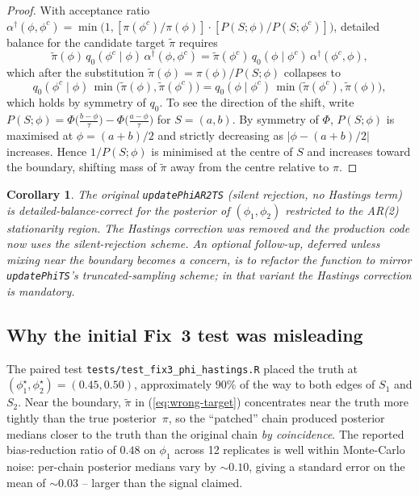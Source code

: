 \documentclass[11pt]{article}
\newcommand{\eref}[1]{(\ref{#1})}
\theoremstyle{plain}
\newtheorem{corollary}[proposition]{Corollary}
\theoremstyle{definition}
\theoremstyle{remark}
\begin{document}
\begin{proof}
With acceptance ratio $\alpha^\dagger(\phi, \phi^c) = \min\!\bigl(1,
[\pi(\phi^c)/\pi(\phi)] \cdot [P(S;\phi)/P(S;\phi^c)]\bigr)$,
detailed balance for the candidate target $\widetilde\pi$ requires
\[
\widetilde\pi(\phi)\, q_0(\phi^c \mid \phi)\, \alpha^\dagger(\phi, \phi^c)
= \widetilde\pi(\phi^c)\, q_0(\phi \mid \phi^c)\, \alpha^\dagger(\phi^c, \phi),
\]
which after the substitution $\widetilde\pi(\phi) = \pi(\phi)/P(S;\phi)$
collapses to
\[
q_0(\phi^c \mid \phi)\, \min\!\bigl(\widetilde\pi(\phi),\widetilde\pi(\phi^c)\bigr)
= q_0(\phi \mid \phi^c)\, \min\!\bigl(\widetilde\pi(\phi^c),\widetilde\pi(\phi)\bigr),
\]
which holds by symmetry of $q_0$. To see the direction of the shift,
write $P(S; \phi) = \Phi\!\bigl(\tfrac{b-\phi}{\tau}\bigr)
- \Phi\!\bigl(\tfrac{a-\phi}{\tau}\bigr)$ for $S = (a, b)$. By symmetry of
$\Phi$, $P(S; \phi)$ is maximised at $\phi = (a + b)/2$ and strictly
decreasing as $|\phi - (a+b)/2|$ increases. Hence $1/P(S;\phi)$ is
minimised at the centre of $S$ and increases toward the boundary,
shifting mass of $\widetilde\pi$ away from the centre relative to $\pi$.
\end{proof}

\begin{corollary}\label{cor:revert}
The original \texttt{updatePhiAR2TS} (silent rejection, no Hastings term)
is detailed-balance-correct for the posterior of $(\phi_1, \phi_2)$
restricted to the AR(2) stationarity region. The Hastings correction was
removed and the production code now uses the silent-rejection scheme. An
optional follow-up, deferred unless mixing near the boundary becomes a
concern, is to refactor the function to mirror \texttt{updatePhiTS}'s
truncated-sampling scheme; in that variant the Hastings correction is
mandatory.
\end{corollary}

\subsection{Why the initial Fix~3 test was misleading}\label{sec:misleading-test}

The paired test \texttt{tests/test\_fix3\_phi\_hastings.R} placed the truth
at $(\phi_1^\star, \phi_2^\star) = (0.45, 0.50)$, approximately $90\%$ of
the way to both edges of $S_1$ and $S_2$. Near the boundary,
$\widetilde\pi$ in \eref{eq:wrong-target} concentrates near the truth more
tightly than the true posterior~$\pi$, so the ``patched'' chain produced
posterior medians closer to the truth than the original chain
\emph{by coincidence}. The reported bias-reduction ratio of $0.48$ on
$\phi_1$ across 12 replicates is well within Monte-Carlo noise: per-chain
posterior medians vary by $\sim 0.10$, giving a standard error on the
mean of $\sim 0.03$ -- larger than the signal claimed.
\end{document}
